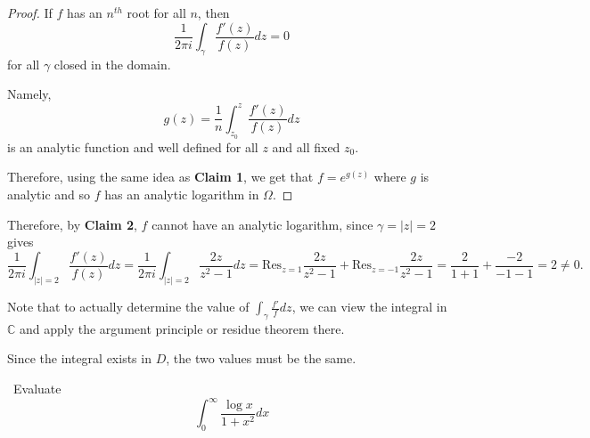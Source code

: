 \documentclass[12pt]{Homework}
\newcommand{\res}{\text{Res}}
\begin{document}
\begin{solution}
\begin{claim}
\begin{proof}
\boxed{\impliedby} If $f$ has an $n^{th}$ root for all $n$, then $$\frac{1}{2\pi i}\int_\gamma\frac{f'(z)}{f(z)}dz=0$$ for all $\gamma$ closed in the domain.

Namely, $$g(z)=\frac{1}{n}\int_{z_0}^z\frac{f'(z)}{f(z)}dz$$ is an analytic function and well defined for all $z$ and all fixed $z_0$.

Therefore, using the same idea as \textbf{Claim 1}, we get that $f=e^{g(z)}$ where $g$ is analytic and so $f$ has an analytic logarithm in $\Omega.$
\end{proof}
\end{claim}

Therefore, by \textbf{Claim 2}, $f$ cannot have an analytic logarithm, since $\gamma=|z|=2$ gives $$\frac{1}{2\pi i}\int_{|z|=2}\frac{f'(z)}{f(z)}dz=\frac{1}{2\pi i}\int_{|z|=2}\frac{2z}{z^2-1}dz=\res_{z=1}\frac{2z}{z^2-1}+\res_{z=-1}\frac{2z}{z^2-1}=\frac{2}{1+1}+\frac{-2}{-1-1}=2\not=0.$$

\begin{framed}
Note that to actually determine the value of $\displaystyle \int_\gamma\frac{f'}{f}dz$, we can view the integral in $\mathbb{C}$ and apply the argument principle or residue theorem there. 

Since the integral exists in $D$, the two values must be the same.
\end{framed}
\end{solution}
\newpage




\begin{problem} $\,$
Evaluate $$\int_0^\infty\frac{\log x}{1+x^2}dx$$
\end{problem}
\end{document}
